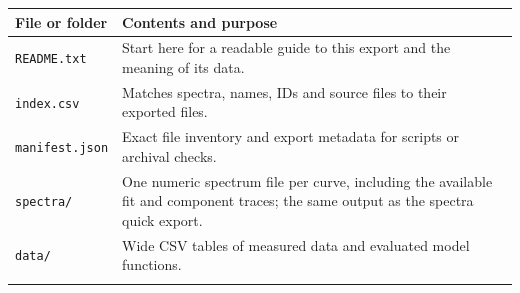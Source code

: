 \documentclass[
  10pt,
  a4paper,
  oneside]{scrreprt}
\begin{document}
\begin{longtable}[]{@{}ll@{}}
\toprule
\begin{minipage}[b]{0.47\columnwidth}\raggedright
File or folder\strut
\end{minipage} & \begin{minipage}[b]{0.47\columnwidth}\raggedright
Contents and purpose\strut
\end{minipage}\tabularnewline
\midrule
\endhead
\begin{minipage}[t]{0.47\columnwidth}\raggedright
\texttt{README.txt}\strut
\end{minipage} & \begin{minipage}[t]{0.47\columnwidth}\raggedright
Start here for a readable guide to this export and the meaning of its
data.\strut
\end{minipage}\tabularnewline
\begin{minipage}[t]{0.47\columnwidth}\raggedright
\texttt{index.csv}\strut
\end{minipage} & \begin{minipage}[t]{0.47\columnwidth}\raggedright
Matches spectra, names, IDs and source files to their exported
files.\strut
\end{minipage}\tabularnewline
\begin{minipage}[t]{0.47\columnwidth}\raggedright
\texttt{manifest.json}\strut
\end{minipage} & \begin{minipage}[t]{0.47\columnwidth}\raggedright
Exact file inventory and export metadata for scripts or archival
checks.\strut
\end{minipage}\tabularnewline
\begin{minipage}[t]{0.47\columnwidth}\raggedright
\texttt{spectra/}\strut
\end{minipage} & \begin{minipage}[t]{0.47\columnwidth}\raggedright
One numeric spectrum file per curve, including the available fit and
component traces; the same output as the spectra quick export.\strut
\end{minipage}\tabularnewline
\begin{minipage}[t]{0.47\columnwidth}\raggedright
\texttt{data/}\strut
\end{minipage} & \begin{minipage}[t]{0.47\columnwidth}\raggedright
Wide CSV tables of measured data and evaluated model functions.\strut
\end{minipage}\tabularnewline
\begin{minipage}[t]{0.47\columnwidth}\raggedright

\end{minipage}
\end{longtable}
\end{document}
